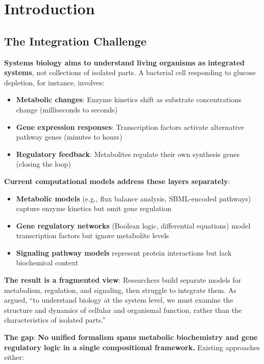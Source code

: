 \chapter{Introduction}
\label{ch:introduction}

\section{The Integration Challenge}
\label{sec:integration-challenge}

\textbf{Systems biology aims to understand living organisms as integrated systems}, not collections of isolated parts. A bacterial cell responding to glucose depletion, for instance, involves:

\begin{itemize}
    \item \textbf{Metabolic changes}: Enzyme kinetics shift as substrate concentrations change (milliseconds to seconds)
    \item \textbf{Gene expression responses}: Transcription factors activate alternative pathway genes (minutes to hours)
    \item \textbf{Regulatory feedback}: Metabolites regulate their own synthesis genes (closing the loop)
\end{itemize}

\textbf{Current computational models address these layers separately}:

\begin{itemize}
    \item \textbf{Metabolic models} (e.g., flux balance analysis, SBML-encoded pathways) capture enzyme kinetics but omit gene regulation
    \item \textbf{Gene regulatory networks} (Boolean logic, differential equations) model transcription factors but ignore metabolite levels
    \item \textbf{Signaling pathway models} represent protein interactions but lack biochemical context
\end{itemize}

\textbf{The result is a fragmented view}: Researchers build separate models for metabolism, regulation, and signaling, then struggle to integrate them. As \citet{Kitano2002} argued, ``to understand biology at the system level, we must examine the structure and dynamics of cellular and organismal function, rather than the characteristics of isolated parts.''

\textbf{The gap}: \textbf{No unified formalism spans metabolic biochemistry and gene regulatory logic in a single compositional framework.} Existing approaches either:

